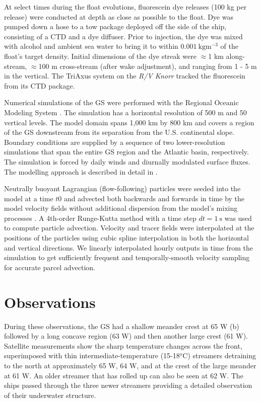 \documentclass[draft,grl]{agutex2015}
\begin{document}
\begin{article}
At select times during the float evolutions, fluorescein dye releases (100 kg per release) were conducted at depth as close as possible to the float.  Dye was pumped down a hose to a tow package deployed off the side of the ship, consisting of a CTD and a dye diffuser.  Prior to injection, the dye was mixed with alcohol and ambient sea water to bring it to within $0.001\ \mathrm{kg m^{-3}}$ of the float's target density. Initial dimensions of the dye streak were $\approx$1 km along-stream, $\approx$100 m cross-stream (after wake adjustment), and ranging from 1 - 5 m in the vertical. The TriAxus system on the \emph{R/V Knorr} tracked the fluorescein from its CTD package.  

Numerical simulations of the GS were performed with the Regional Oceanic Modeling System \citep[ROMS][]{shchepetkinmcwilliams05}. The simulation has a horizontal resolution of 500 m and 50 vertical levels. The model domain spans 1,000 km by 800 km and covers a region of the GS downstream from its separation from the U.S. continental slope. Boundary conditions are supplied by a sequence of two lower-resolution simulations that span the entire GS region and the Atlantic basin, respectively. The simulation is forced by daily winds and diurnally modulated surface fluxes. The modelling approach is described in detail in \citet{gulaetal15}.

Neutrally buoyant Lagrangian (flow-following) particles were seeded into the model at a time $t0$ and advected both backwards and forwards in time by the model velocity fields without additional dispersion from the model's mixing processes \citep{gulaetal14}. A 4th-order Runge-Kutta method with a  time step  $dt = 1\ \mathrm{s}$ was used to compute particle advection. Velocity and tracer fields were interpolated at the positions of the particles using cubic spline interpolation in both the horizontal and vertical directions.   We linearly interpolated hourly outputs in time from the simulation to get sufficiently frequent and temporally-smooth velocity sampling for accurate parcel advection.


\section{Observations}

During these observations, the GS had a shallow meander crest at 65 W (b)  followed by a long concave region (63 W) and then another large  crest (61 W).  Satellite measurements show the sharp temperature changes across the front, superimposed with thin intermediate-temperature (15-18$^o$C) streamers detraining to the north at approximately 65 W, 64 W, and at the crest of the large meander at 61 W.  An older streamer that has rolled up can also be seen at 62 W.  The ships passed through the three newer streamers providing a detailed observation of their underwater structure.  


\end{article}
\end{document}
